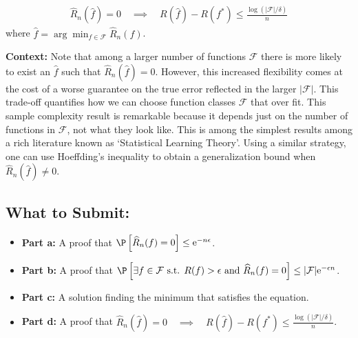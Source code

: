 \documentclass{article}
\providecommand*{\eu}{\ensuremath{\mathrm{e}}}
\begin{document}
\begin{bprob}
\begin{enumerate}
        \begin{align*}
            \widehat{R}_n(\widehat{f})=0 \quad \implies \quad  R(\widehat f) - R\left(f^*\right) \leq \frac{\log(\lvert\mathcal{F}\rvert/\delta)}{n}
        \end{align*}
        where $\widehat f = \arg\min_{f\in\mathcal{F}} \widehat R_n(f)$.
    \end{enumerate}
    \textbf{Context:}
    Note that among a larger number of functions $\mathcal{F}$ there is more likely to exist an $\widehat{f}$ such that $\widehat{R}_n(\widehat{f})=0$. 
    However, this increased flexibility comes at the cost of a worse guarantee on the true error reflected in the larger $\lvert \mathcal{F}\rvert$. This trade-off quantifies how we can choose function classes $\mathcal{F}$ that over fit.
    This sample complexity result is remarkable because it depends just on the number of functions in $\mathcal{F}$, not what they look like. This is among the simplest results among a rich literature known as `Statistical Learning Theory'.
    Using a similar strategy, one can use Hoeffding's inequality to obtain a generalization bound when $\widehat{R}_n(\widehat{f}) \neq 0$.
    
    \subsection*{What to Submit:}
    \begin{itemize}
        \item \textbf{Part a:} A proof that $\P\left[ \widehat{R}_n(f) = 0 \right] \leq \eu^{-n \epsilon}$.
        \item \textbf{Part b:} A proof that $\P \left[\exists f \in \mathcal{F}\text{ s.t. } R(f) > \epsilon \text{ and }  \widehat{R}_n(f) = 0 \right] \le \lvert\mathcal{F}\rvert \eu^{-\epsilon n}$.
        \item \textbf{Part c:} A solution finding the minimum that satisfies the equation.
        \item \textbf{Part d:} A proof that $\widehat{R}_n(\widehat{f})=0 \quad \implies \quad  R(\widehat f) - R\left(f^*\right) \leq \frac{\log(\lvert\mathcal{F}\rvert/\delta)}{n}$.
    \end{itemize}
\end{bprob}
\end{document}
